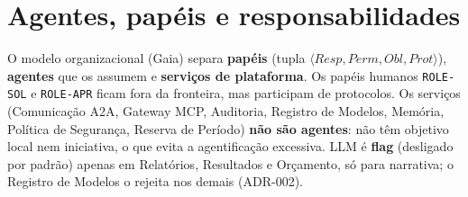 \documentclass[10pt,a4paper]{article}
\newcommand{\code}[1]{\texttt{#1}}
\begin{document}
\section{Agentes, papéis e responsabilidades}\label{sec:agentes}
O modelo organizacional (Gaia) separa \textbf{papéis} (tupla $\langle Resp, Perm, Obl, Prot\rangle$),
\textbf{agentes} que os assumem e \textbf{serviços de plataforma}. Os papéis humanos \code{ROLE-SOL} e
\code{ROLE-APR} ficam fora da fronteira, mas participam de protocolos. Os serviços (Comunicação A2A, Gateway MCP,
Auditoria, Registro de Modelos, Memória, Política de Segurança, Reserva de Período) \textbf{não são agentes}: não têm
objetivo local nem iniciativa, o que evita a agentificação excessiva. LLM é \textbf{flag} (desligado por padrão)
apenas em Relatórios, Resultados e Orçamento, só para narrativa; o Registro de Modelos o rejeita nos demais (ADR-002).
\end{document}
